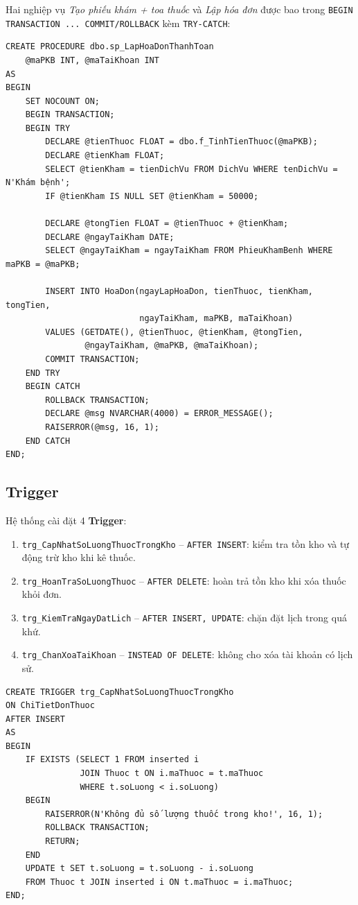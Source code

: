 \documentclass[12pt,a4paper]{report}
\begin{document}
Hai nghiệp vụ \emph{Tạo phiếu khám + toa thuốc} và \emph{Lập hóa đơn} được bao trong \texttt{BEGIN TRANSACTION ... COMMIT/ROLLBACK} kèm \texttt{TRY-CATCH}:

\begin{lstlisting}[language=TSQL,caption={SP sp\_LapHoaDonThanhToan -- sử dụng Transaction}]
CREATE PROCEDURE dbo.sp_LapHoaDonThanhToan
    @maPKB INT, @maTaiKhoan INT
AS
BEGIN
    SET NOCOUNT ON;
    BEGIN TRANSACTION;
    BEGIN TRY
        DECLARE @tienThuoc FLOAT = dbo.f_TinhTienThuoc(@maPKB);
        DECLARE @tienKham FLOAT;
        SELECT @tienKham = tienDichVu FROM DichVu WHERE tenDichVu = N'Khám bệnh';
        IF @tienKham IS NULL SET @tienKham = 50000;

        DECLARE @tongTien FLOAT = @tienThuoc + @tienKham;
        DECLARE @ngayTaiKham DATE;
        SELECT @ngayTaiKham = ngayTaiKham FROM PhieuKhamBenh WHERE maPKB = @maPKB;

        INSERT INTO HoaDon(ngayLapHoaDon, tienThuoc, tienKham, tongTien,
                           ngayTaiKham, maPKB, maTaiKhoan)
        VALUES (GETDATE(), @tienThuoc, @tienKham, @tongTien,
                @ngayTaiKham, @maPKB, @maTaiKhoan);
        COMMIT TRANSACTION;
    END TRY
    BEGIN CATCH
        ROLLBACK TRANSACTION;
        DECLARE @msg NVARCHAR(4000) = ERROR_MESSAGE();
        RAISERROR(@msg, 16, 1);
    END CATCH
END;
\end{lstlisting}

\subsection{Trigger}

Hệ thống cài đặt 4 \textbf{Trigger}:

\begin{enumerate}[leftmargin=*]
\item \texttt{trg\_CapNhatSoLuongThuocTrongKho} -- \texttt{AFTER INSERT}: kiểm tra tồn kho và tự động trừ kho khi kê thuốc.
\item \texttt{trg\_HoanTraSoLuongThuoc} -- \texttt{AFTER DELETE}: hoàn trả tồn kho khi xóa thuốc khỏi đơn.
\item \texttt{trg\_KiemTraNgayDatLich} -- \texttt{AFTER INSERT, UPDATE}: chặn đặt lịch trong quá khứ.
\item \texttt{trg\_ChanXoaTaiKhoan} -- \texttt{INSTEAD OF DELETE}: không cho xóa tài khoản có lịch sử.
\end{enumerate}

\begin{lstlisting}[language=TSQL,caption={Trigger kiểm tra \& cập nhật tồn kho thuốc}]
CREATE TRIGGER trg_CapNhatSoLuongThuocTrongKho
ON ChiTietDonThuoc
AFTER INSERT
AS
BEGIN
    IF EXISTS (SELECT 1 FROM inserted i
               JOIN Thuoc t ON i.maThuoc = t.maThuoc
               WHERE t.soLuong < i.soLuong)
    BEGIN
        RAISERROR(N'Không đủ số lượng thuốc trong kho!', 16, 1);
        ROLLBACK TRANSACTION;
        RETURN;
    END
    UPDATE t SET t.soLuong = t.soLuong - i.soLuong
    FROM Thuoc t JOIN inserted i ON t.maThuoc = i.maThuoc;
END;
\end{lstlisting}
\end{document}
